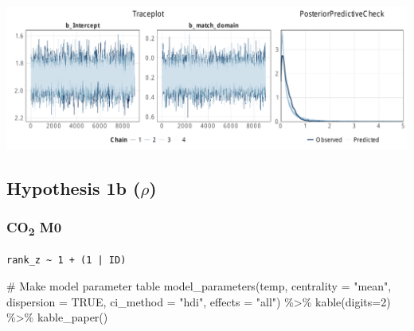 \documentclass[
  letterpaper,
  DIV=11,
  numbers=noendperiod]{scrartcl}
\newenvironment{Shaded}{\begin{snugshade}}{\end{snugshade}}
\newcommand{\AttributeTok}[1]{\textcolor[rgb]{0.40,0.45,0.13}{#1}}
\newcommand{\CommentTok}[1]{\textcolor[rgb]{0.37,0.37,0.37}{#1}}
\newcommand{\ConstantTok}[1]{\textcolor[rgb]{0.56,0.35,0.01}{#1}}
\newcommand{\DecValTok}[1]{\textcolor[rgb]{0.68,0.00,0.00}{#1}}
\newcommand{\FunctionTok}[1]{\textcolor[rgb]{0.28,0.35,0.67}{#1}}
\newcommand{\NormalTok}[1]{\textcolor[rgb]{0.00,0.23,0.31}{#1}}
\newcommand{\OtherTok}[1]{\textcolor[rgb]{0.00,0.23,0.31}{#1}}
\newcommand{\SpecialCharTok}[1]{\textcolor[rgb]{0.37,0.37,0.37}{#1}}
\newcommand{\StringTok}[1]{\textcolor[rgb]{0.13,0.47,0.30}{#1}}
\begin{document}
\includegraphics{supplement_files/figure-pdf/h1aM1kcal-1.pdf}

\subsection{\texorpdfstring{Hypothesis 1b
(\(\rho\))}{Hypothesis 1b (\textbackslash rho)}}\label{hypothesis-1b-rho}

\subsubsection{\texorpdfstring{CO\textsubscript{2}
M0}{CO2 M0}}\label{co2-m0-1}

\begin{Shaded}
\end{Shaded}

\begin{verbatim}
rank_z ~ 1 + (1 | ID) 
\end{verbatim}

\begin{Shaded}
\begin{Highlighting}[]
\CommentTok{\# Make model parameter table}
\FunctionTok{model\_parameters}\NormalTok{(temp, }\AttributeTok{centrality =} \StringTok{"mean"}\NormalTok{, }\AttributeTok{dispersion =} \ConstantTok{TRUE}\NormalTok{, }
                 \AttributeTok{ci\_method =} \StringTok{"hdi"}\NormalTok{, }\AttributeTok{effects =} \StringTok{"all"}\NormalTok{) }\SpecialCharTok{\%\textgreater{}\%} 
  \FunctionTok{kable}\NormalTok{(}\AttributeTok{digits=}\DecValTok{2}\NormalTok{) }\SpecialCharTok{\%\textgreater{}\%} \FunctionTok{kable\_paper}\NormalTok{()}
\end{Highlighting}
\end{Shaded}
\end{document}
